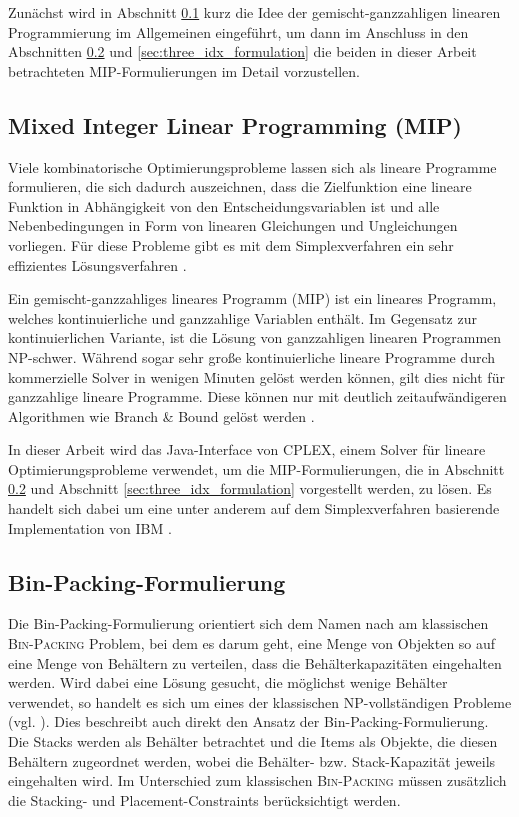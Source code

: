 Zunächst wird in Abschnitt \ref{sec:mip_definition} kurz die Idee der gemischt-ganzzahligen linearen Programmierung im Allgemeinen
eingeführt, um dann im Anschluss in den Abschnitten \ref{sec:bin_packing_formulation} und \ref{sec:three_idx_formulation} die beiden in dieser Arbeit betrachteten MIP-Formulierungen im Detail vorzustellen.

\subsection{Mixed Integer Linear Programming (MIP)}
\label{sec:mip_definition}

Viele kombinatorische Optimierungsprobleme lassen sich als lineare Programme formulieren, die sich dadurch
auszeichnen, dass die Zielfunktion eine lineare Funktion in Abhängigkeit von den Entscheidungsvariablen ist
und alle Nebenbedingungen in Form von linearen Gleichungen und Ungleichungen vorliegen. Für diese Probleme gibt es mit dem Simplexverfahren ein sehr effizientes Lösungsverfahren \cite{Knust2017}.

\vfill
\pagebreak

Ein gemischt-ganzzahliges lineares Programm (MIP) ist ein lineares Programm, welches kontinuierliche und ganzzahlige Variablen
enthält. Im Gegensatz zur kontinuierlichen Variante, ist die Lösung von ganzzahligen linearen Programmen NP-schwer.
Während sogar sehr große kontinuierliche lineare Programme durch kommerzielle Solver in wenigen Minuten gelöst werden können, gilt dies nicht für ganzzahlige lineare Programme. Diese können nur mit deutlich zeitaufwändigeren Algorithmen wie Branch \& Bound gelöst werden \cite{Brucker2006}.

In dieser Arbeit wird das Java-Interface von CPLEX, einem Solver für lineare Optimierungsprobleme verwendet,
um die MIP-Formulierungen, die in Abschnitt \ref{sec:bin_packing_formulation} und Abschnitt \ref{sec:three_idx_formulation} vorgestellt werden, zu lösen. Es handelt sich dabei um eine unter anderem auf dem Simplexverfahren basierende Implementation von IBM \cite{CPLEX2015}.

\subsection{Bin-Packing-Formulierung}
\label{sec:bin_packing_formulation}

Die Bin-Packing-Formulierung orientiert sich dem Namen nach am klassischen \textsc{Bin-Packing} Problem, bei dem es darum geht,
eine Menge von Objekten so auf eine Menge von Behältern zu verteilen, dass die Behälterkapazitäten eingehalten werden.
Wird dabei eine Lösung gesucht, die möglichst wenige Behälter verwendet, so handelt es sich um eines der klassischen NP-vollständigen
Probleme (vgl. \citet{Garey1979}).
Dies beschreibt auch direkt den Ansatz der Bin-Packing-Formulierung. Die Stacks werden als Behälter betrachtet und die Items als Objekte,
die diesen Behältern zugeordnet werden, wobei die Behälter- bzw. Stack-Kapazität jeweils eingehalten wird. Im Unterschied zum klassischen \textsc{Bin-Packing} müssen zusätzlich die Stacking- und Placement-Constraints berücksichtigt werden.

